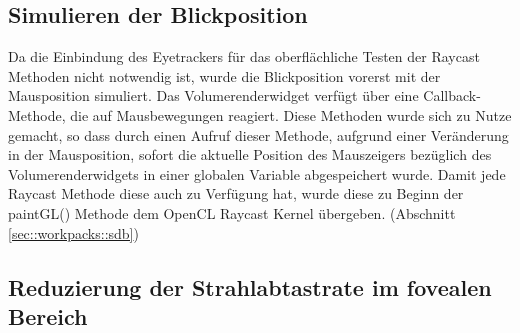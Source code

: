 \subsection{Simulieren der Blickposition}\label{sec::ida::sdb}
Da die Einbindung des Eyetrackers für das oberflächliche Testen der Raycast Methoden nicht notwendig ist, wurde die Blickposition vorerst mit der Mausposition simuliert.
Das Volumerenderwidget verfügt über eine Callback-Methode, die auf Mausbewegungen reagiert.
Diese Methoden wurde sich zu Nutze gemacht, so dass durch einen Aufruf dieser Methode, aufgrund einer Veränderung in der Mausposition, sofort die aktuelle Position des Mauszeigers bezüglich des Volumerenderwidgets in einer globalen Variable abgespeichert wurde.
Damit jede Raycast Methode diese auch zu Verfügung hat, wurde diese zu Beginn der paintGL() Methode dem OpenCL Raycast Kernel übergeben. (Abschnitt \ref{sec::workpacks::sdb})

\subsection{Reduzierung der Strahlabtastrate im fovealen Bereich}\label{sec::ida::rdsifb}